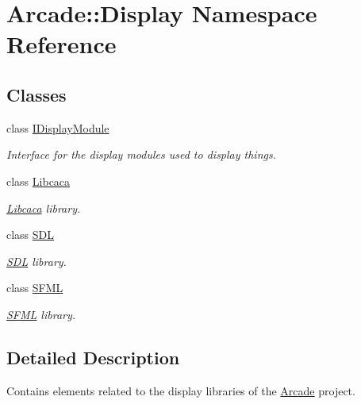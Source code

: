 \hypertarget{namespaceArcade_1_1Display}{}\section{Arcade\+::Display Namespace Reference}
\label{namespaceArcade_1_1Display}
\subsection*{Classes}
\begin{DoxyCompactItemize}
\item 
class \mbox{\hyperlink{classArcade_1_1Display_1_1IDisplayModule}{I\+Display\+Module}}
\begin{DoxyCompactList}\small\item\em Interface for the display modules used to display things. \end{DoxyCompactList}\item 
class \mbox{\hyperlink{classArcade_1_1Display_1_1Libcaca}{Libcaca}}
\begin{DoxyCompactList}\small\item\em \mbox{\hyperlink{classArcade_1_1Display_1_1Libcaca}{Libcaca}} library. \end{DoxyCompactList}\item 
class \mbox{\hyperlink{classArcade_1_1Display_1_1SDL}{S\+DL}}
\begin{DoxyCompactList}\small\item\em \mbox{\hyperlink{classArcade_1_1Display_1_1SDL}{S\+DL}} library. \end{DoxyCompactList}\item 
class \mbox{\hyperlink{classArcade_1_1Display_1_1SFML}{S\+F\+ML}}
\begin{DoxyCompactList}\small\item\em \mbox{\hyperlink{classArcade_1_1Display_1_1SFML}{S\+F\+ML}} library. \end{DoxyCompactList}\end{DoxyCompactItemize}


\subsection{Detailed Description}
Contains elements related to the display libraries of the \mbox{\hyperlink{namespaceArcade}{Arcade}} project. 